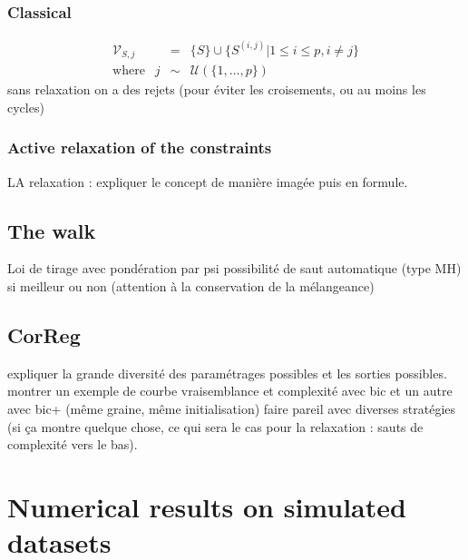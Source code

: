 \documentclass[12pt,a4paper]{report}
\begin{document}
		\subsection{Classical}
			\begin{eqnarray}
		\mathcal{V}_{S,j}&=& \{S \}\cup \{ S^{(i,j)} |1\leq i \leq p, i\neq j  \} \\
		\textrm{where }\ \ j &\sim & \mathcal{U}(\{1,\dots,p\}) 
	\end{eqnarray}
		sans relaxation on a des rejets (pour éviter les croisements, ou au moins les cycles)
		\subsection{Active relaxation of the constraints}
			LA relaxation : expliquer le concept de manière imagée puis en formule.			
			
	\section{The walk}
		Loi de tirage avec pondération par psi
		possibilité de saut automatique (type MH) si meilleur ou non (attention à la conservation de la mélangeance)
	\section{CorReg}	
		expliquer la grande diversité des paramétrages possibles et les sorties possibles.
montrer un exemple de courbe vraisemblance et complexité avec bic et un autre avec bic+ (même graine, même initialisation)
faire pareil avec diverses stratégies (si ça montre quelque chose, ce qui sera le cas pour la relaxation : sauts de complexité vers le bas).

		
	\chapter{Numerical results on simulated datasets} \label{sectionsimul}
\end{document}
